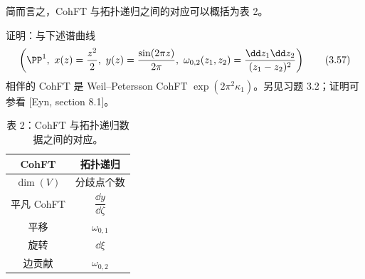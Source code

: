 

简而言之，CohFT 与拓扑递归之间的对应可以概括为表 2。

\begin{exercise}[3.4]
证明：与下述谱曲线
\begin{equation}
  \left(\PP^1,\ x(z)=\frac{z^2}{2},\ y(z)=\frac{\sin(2\pi z)}{2\pi},\ \omega_{0,2}(z_1,z_2)=\frac{\dd z_1\dd z_2}{(z_1-z_2)^2}\right)
  \tag{3.57}
\end{equation}
相伴的 CohFT 是 Weil–Petersson CohFT $\exp(2\pi^2\kappa_1)$。另见习题 3.2；证明可参看 [Eyn, section 8.1]。
\end{exercise}



\begin{table}[htbp]\centering\small
\caption*{表 2：CohFT 与拓扑递归数据之间的对应。}
\begin{tabular}{c|c}
\toprule
CohFT & 拓扑递归\\
\midrule
$\dim(V)$ & 分歧点个数\\
平凡 CohFT & $\dfrac{\dd y}{\dd\zeta}$\\
平移 & $\omega_{0,1}$\\
旋转 & $\dd\xi$\\
边贡献 & $\omega_{0,2}$\\
\bottomrule
\end{tabular}
\end{table}



